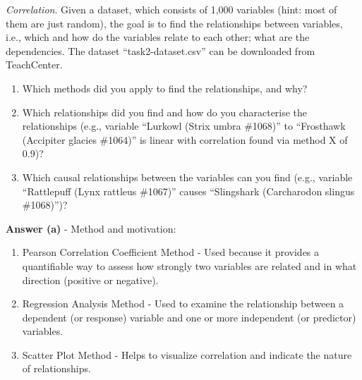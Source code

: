 \documentclass[a4paper,10pt]{article}\setlength{\textheight}{10in}\setlength{\textwidth}{6.5in}\setlength{\topmargin}{-0.125in}\setlength{\oddsidemargin}{-.2in}\setlength{\evensidemargin}{-.2in}\setlength{\headsep}{0.2in}\setlength{\footskip}{0pt}\usepackage{amsmath}\usepackage{fancyhdr}\usepackage{enumitem}\usepackage{hyperref}\usepackage{xcolor}\usepackage{graphicx}\usepackage[export]{adjustbox}\usepackage{caption}\usepackage{float}\usepackage{booktabs}\usepackage{makecell}\pagestyle{fancy}
\begin{document}
\begin{enumerate}[topsep=0mm, partopsep=0mm, leftmargin=*]
\clearpage
{\color{blue}
\newpage\item\textit{Correlation}. Given a dataset, which consists of 1,000 variables (hint: most of them are just random), the goal is to find the relationships between variables, i.e., which and how do the variables relate to each other; what are the dependencies.
The dataset ``task2-dataset.csv'' can be downloaded from TeachCenter.
\begin{enumerate}
	\item Which methods did you apply to find the relationships, and why?
	\item Which relationships did you find and how do you characterise the relationships (e.g., variable ``Lurkowl (Strix umbra \#1068)'' to ``Frosthawk (Accipiter glacies \#1064)'' is linear with correlation found via method X of 0.9)?
	\item Which causal relationships between the variables can you find (e.g., variable ``Rattlepuff (Lynx rattleus \#1067)'' causes ``Slingshark (Carcharodon slingus \#1068)'')?
\end{enumerate}
}

\textbf{Answer (a)} - Method and motivation:
    \begin{enumerate}
        \item Pearson Correlation Coefficient Method - Used because it provides a quantifiable way to assess how strongly two variables are related and in what direction (positive or negative).
        \item Regression Analysis Method - Used to examine the relationship between a dependent (or response) variable and one or more independent (or predictor) variables.
        \item Scatter Plot Method - Helps to visualize correlation and indicate the nature of relationships.
        
    \end{enumerate}


\end{enumerate}
\end{document}
